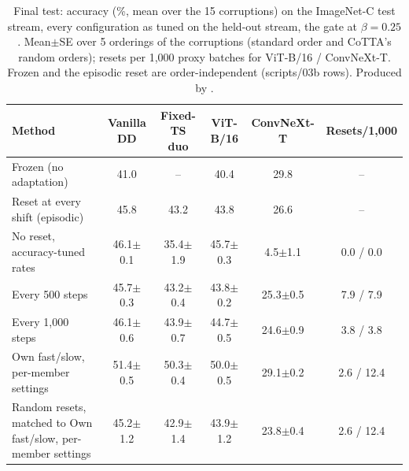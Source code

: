 \begin{table}[t]
  \centering\small
  \begin{tabular}{@{}lccccc@{}}
    \toprule
    Method & Vanilla DD & Fixed-TS duo & ViT-B/16 & ConvNeXt-T & Resets/1,000 \\
    \midrule
    Frozen (no adaptation) & 41.0 & -- & 40.4 & 29.8 & -- \\
    Reset at every shift (episodic) & 45.8 & 43.2 & 43.8 & 26.6 & -- \\
    \midrule
    No reset, accuracy-tuned rates & 46.1$\pm$0.1 & 35.4$\pm$1.9 & 45.7$\pm$0.3 & 4.5$\pm$1.1 & 0.0 / 0.0 \\
    \midrule
    Every 500 steps & 45.7$\pm$0.3 & 43.2$\pm$0.4 & 43.8$\pm$0.2 & 25.3$\pm$0.5 & 7.9 / 7.9 \\
    Every 1,000 steps & 46.1$\pm$0.6 & 43.9$\pm$0.7 & 44.7$\pm$0.5 & 24.6$\pm$0.9 & 3.8 / 3.8 \\
    \midrule
    Own fast/slow, per-member settings & 51.4$\pm$0.5 & 50.3$\pm$0.4 & 50.0$\pm$0.5 & 29.1$\pm$0.2 & 2.6 / 12.4 \\
    \midrule
    Random resets, matched to Own fast/slow, per-member settings & 45.2$\pm$1.2 & 42.9$\pm$1.4 & 43.9$\pm$1.2 & 23.8$\pm$0.4 & 2.6 / 12.4 \\
    \bottomrule
  \end{tabular}
  \caption{Final test: accuracy (\%, mean over the 15 corruptions) on the ImageNet-C test stream, every configuration as tuned on the held-out stream, the gate at $\beta=0.25$. Mean$\pm$SE over 5 orderings of the corruptions (standard order and CoTTA's random orders); resets per 1,000 proxy batches for ViT-B/16 / ConvNeXt-T. Frozen and the episodic reset are order-independent (scripts/03b rows). Produced by .}
  \label{tab:final_test}
\end{table}
